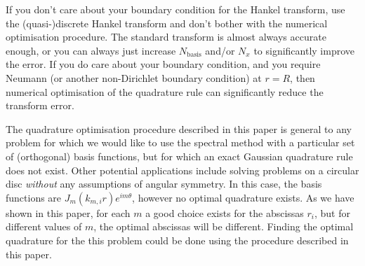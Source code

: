 \documentclass[aip,amsmath,amssymb,reprint,twocolumn]{revtex4-1}
\newcommand{\Nbasis}{{N_{\text{basis}}}}
\newcommand{\Nx}{{N_{x}}}
\begin{document}
If you don't care about your boundary condition for the Hankel transform, use the (quasi-)discrete Hankel transform and don't bother with the numerical optimisation procedure.  The standard transform is almost always accurate enough, or you can always just increase $\Nbasis$ and/or $\Nx$ to significantly improve the error.  If you do care about your boundary condition, and you require Neumann (or another non-Dirichlet boundary condition) at $r=R$, then numerical optimisation of the quadrature rule can significantly reduce the transform error.

The quadrature optimisation procedure described in this paper is general to any problem for which we would like to use the spectral method with a particular set of (orthogonal) basis functions, but for which an exact Gaussian quadrature rule does not exist.  Other potential applications include solving problems on a circular disc \emph{without} any assumptions of angular symmetry.  In this case, the basis functions are $J_m(k_{m,i} r) e^{i m \theta}$, however no optimal quadrature exists.  As we have shown in this paper, for each $m$ a good choice exists for the abscissas $r_i$, but for different values of $m$, the optimal abscissas will be different.  Finding the optimal quadrature for the this problem could be done using the procedure described in this paper.



\end{document}
